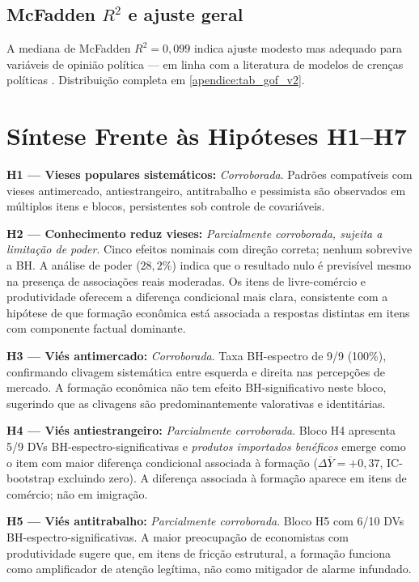 \subsection{McFadden $R^2$ e ajuste geral}

A mediana de McFadden $R^2 = 0{,}099$ indica ajuste modesto mas adequado para variáveis de opinião política — em linha com a literatura de modelos de crenças políticas \cite{mccullaghNelder1989}. Distribuição completa em \autoref{apendice:tab_gof_v2}.

\section{Síntese Frente às Hipóteses H1--H7}
\label{sec:sintese-hipoteses}

\textbf{H1 — Vieses populares sistemáticos:} \textit{Corroborada}. Padrões compatíveis com vieses antimercado, antiestrangeiro, antitrabalho e pessimista são observados em múltiplos itens e blocos, persistentes sob controle de covariáveis.

\textbf{H2 — Conhecimento reduz vieses:} \textit{Parcialmente corroborada, sujeita a limitação de poder}. Cinco efeitos nominais com direção correta; nenhum sobrevive a BH. A análise de poder ($28{,}2\%$) indica que o resultado nulo é previsível mesmo na presença de associações reais moderadas. Os itens de livre-comércio e produtividade oferecem a diferença condicional mais clara, consistente com a hipótese de que formação econômica está associada a respostas distintas em itens com componente factual dominante.

\textbf{H3 — Viés antimercado:} \textit{Corroborada}. Taxa BH-espectro de 9/9 (100\%), confirmando clivagem sistemática entre esquerda e direita nas percepções de mercado. A formação econômica não tem efeito BH-significativo neste bloco, sugerindo que as clivagens são predominantemente valorativas e identitárias.

\textbf{H4 — Viés antiestrangeiro:} \textit{Parcialmente corroborada}. Bloco H4 apresenta 5/9 DVs BH-espectro-significativas e \textit{produtos importados benéficos} emerge como o item com maior diferença condicional associada à formação ($\Delta\bar{Y} = +0{,}37$, IC-bootstrap excluindo zero). A diferença associada à formação aparece em itens de comércio; não em imigração.

\textbf{H5 — Viés antitrabalho:} \textit{Parcialmente corroborada}. Bloco H5 com 6/10 DVs BH-espectro-significativas. A maior preocupação de economistas com produtividade sugere que, em itens de fricção estrutural, a formação funciona como amplificador de atenção legítima, não como mitigador de alarme infundado.

